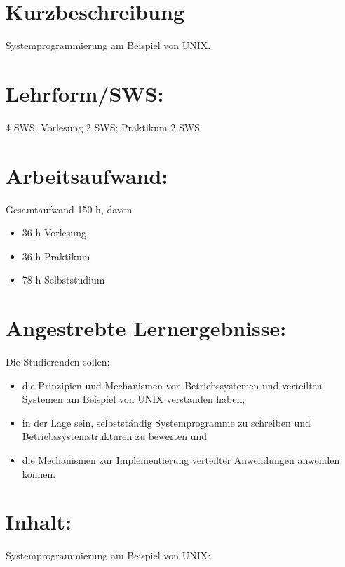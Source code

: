 \section*{Kurzbeschreibung}\label{kurzbeschreibung}

Systemprogrammierung am Beispiel von UNIX.

\section*{Lehrform/SWS:}\label{lehrformsws-5}

4 SWS: Vorlesung 2 SWS; Praktikum 2 SWS

\section*{Arbeitsaufwand:}\label{arbeitsaufwand-5}

Gesamtaufwand 150 h, davon

\begin{itemize}
\item
  36 h Vorlesung
\item
  36 h Praktikum
\item
  78 h Selbststudium
\end{itemize}

\section*{Angestrebte
Lernergebnisse:}\label{angestrebte-lernergebnisse-5}

Die Studierenden sollen:

\begin{itemize}
\item
  die Prinzipien und Mechanismen von Betriebssystemen und verteilten
  Systemen am Beispiel von UNIX verstanden haben,
\item
  in der Lage sein, selbstständig Systemprogramme zu schreiben und
  Betriebssystemstrukturen zu bewerten und
\item
  die Mechanismen zur Implementierung verteilter Anwendungen anwenden
  können.
\end{itemize}

\section*{Inhalt:}\label{inhalt-5}

Systemprogrammierung am Beispiel von UNIX:

